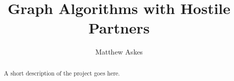 \documentclass[11pt
              , a4paper
              , twoside
              , openright
              ]{book}
\title{Graph Algorithms with Hostile Partners}
\author{Matthew Askes}
\date{}
\theoremstyle{definition}
\begin{document}
\frontmatter

\begin{abstract}

A short description of the project goes here.

\end{abstract}

\maketitle

%
\tableofcontents



\mainmatter








\backmatter


\end{document}
